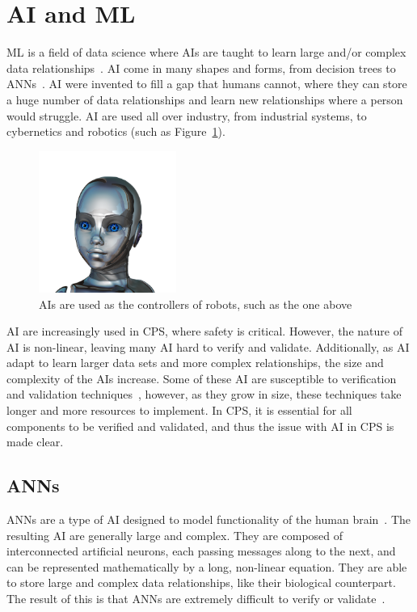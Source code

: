 \section{\acf{AI} and \acf{ML}}
\acf{ML} is a field of data science where \acfp{AI} are taught to learn large and/or complex data relationships~\cite{ai}.
\ac{AI} come in many shapes and forms, from decision trees to \acfp{ANN}~\cite{ai-types}.
\ac{AI} were invented to fill a gap that humans cannot, where they can store a huge number of data relationships and learn new relationships where a person would struggle.
\ac{AI} are used all over industry, from industrial systems, to cybernetics and robotics (such as Figure~\ref{fig:ai-girl}).

\begin{figure}[h]
	\centering
	\includegraphics[width=0.4\textwidth]{Content/fig/ai-girl.png}
	\caption{\acp{AI} are used as the controllers of robots, such as the one above~\cite{robotgirl-pic} \label{fig:ai-girl}}
\end{figure}

\ac{AI} are increasingly used in \ac{CPS}, where safety is critical.
However, the nature of \ac{AI} is non-linear, leaving many \ac{AI} hard to verify and validate.
Additionally, as \ac{AI} adapt to learn larger data sets and more complex relationships, the size and complexity of the \acp{AI} increase.
Some of these \ac{AI} are susceptible to verification and validation techniques~\cite{aiverify}, however, as they grow in size, these techniques take longer and more resources to implement.
In \ac{CPS}, it is essential for all components to be verified and validated, and thus the issue with \ac{AI} in \ac{CPS} is made clear.

\subsection{\acfp{ANN}}
\acp{ANN} are a type of \ac{AI} designed to model functionality of the human brain~\cite{kohonen1988introduction}.
The resulting \ac{AI} are generally large and complex.
They are composed of interconnected artificial neurons, each passing messages along to the next, and can be represented mathematically by a long, non-linear equation.
They are able to store large and complex data relationships, like their biological counterpart.
The result of this is that \acp{ANN} are extremely difficult to verify or validate~\cite{menzies2005verification}.

